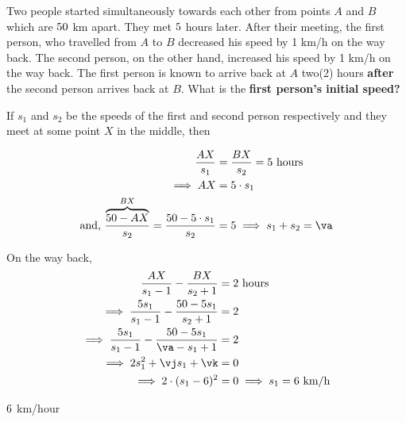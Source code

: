 

\DIVIDE\vd\vt\va
\ADD{}\vb
\EXPR[0]
\EXPR[0]

\question[5] Two people started simultaneously towards each other from points $A$ and $B$ which 
are $50$ km apart. They met $5$ hours later. After their meeting, the first person, who travelled 
from $A$ to $B$ decreased his speed by 1 km/h on the way back. The second person, 
on the other hand, increased his speed by 1 km/h on the way back. The first person 
is known to arrive back at $A$ two(2) hours \textbf{after} the second person arrives back at $B$. What is 
the \textbf{first person's initial speed?}

\watchout

\begin{solution}[\fullpage]
	If $s_1$ and $s_2$ be the speeds of the first and second person respectively and they
	meet at some point $X$ in the middle, then 
	
	\begin{align}
		\dfrac{AX}{s_1} &= \dfrac{BX}{s_2} = \vt\text{ hours} \\
		\implies AX &= \vt\cdot s_1 \\
		\text{and, } \dfrac{\overbrace{\vd-AX}^{BX}}{s_2} = \dfrac{\vd-\vt\cdot s_1}{s_2} &= \vt \implies s_1 + s_2 = \va
	\end{align}
	
	On the way back, 
	\begin{align}
		\dfrac{AX}{s_1 - 1} - \dfrac{BX}{s_2 + 1} &= 2\text{ hours} \\
		\implies \dfrac{\vt s_1}{s_1 - 1} - \dfrac{\vd - \vt s_1}{s_2 + 1} &= 2 \\
		\implies \dfrac{\vt s_1}{s_1 - 1} - \dfrac{\vd - \vt s_1}{\va-s_1+1} &= 2 \\
    \implies 2s_1^2 + \vj s_1 + \vk &= 0 \\
    \implies 2\cdot(s_1 - \vs)^2 &= 0\implies s_1 = \vs\text{ km/h}
	\end{align}
	
\end{solution}

\ifprintanswers\begin{codex}$6$ km/hour\end{codex}\fi
